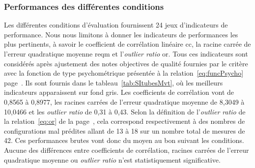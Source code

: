 \subsubsection{Performances des différentes conditions}
Les différentes conditions d'évaluation fournissent 24 jeux d'indicateurs de performance. Nous nous limitons à donner les indicateurs de performances les plus pertinents, à savoir le coefficient de corrélation linéaire cc, la racine carrée de l'erreur quadratique moyenne reqm et l'\emph{outlier ratio} or. Tous ces indicateurs sont considérés après ajustement des notes objectives de qualité fournies par le critère avec la fonction de type psychométrique présentée à la relation~\ref{eq:funcPsycho} page~\pageref{eq:funcPsycho}. Ils sont fournis dans le tableau~\ref{tab:SItubesMvt}, où les meilleurs indicateurs apparaissent sur fond gris. Les coefficients de corrélation vont de 0,8565 à 0,8977, les racines carrées de l'erreur quadratique moyenne de 8,3049 à 10,0466 et les \emph{outlier ratio} de 0,31 à 0,43. Selon la définition de l'\emph{outlier ratio} de la relation~\ref{eq:or} de la page~\pageref{eq:or}, cela correspond respectivement à des nombres de configurations mal prédites allant de 13 à 18 sur un nombre total de mesures de 42. Ces performances brutes vont donc du moyen au bon suivant les conditions. Aucune des différences entre coefficients de corrélation, racines carrées de l'erreur quadratique moyenne ou \emph{outlier ratio} n'est statistiquement significative.

